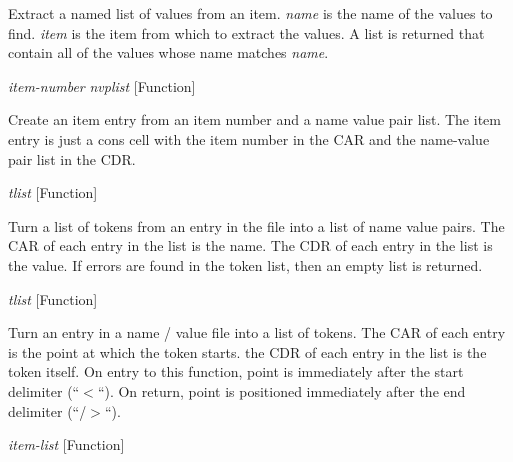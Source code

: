 \begin{doc-string}
Extract a named list of values from an item.  \emph{name} is the name of the values to
find.  \emph{item} is the item from which to extract the values.  A list is returned that contain
all of the values whose name matches \emph{name}.
\end{doc-string}

\vspace{1em}
\noindent
{}
\usebox{\funcname}\emph{item-number} \emph{nvplist}
 \hfill [Function]

\begin{doc-string}
Create an item entry from an item number and a name value pair list.
The item entry is just a cons cell with the item number in the CAR and the
name-value pair list in the CDR.
\end{doc-string}

\vspace{1em}
\noindent
{}
\usebox{\funcname}\emph{tlist}
 \hfill [Function]

\begin{doc-string}
Turn a list of tokens from an entry in the file into a list of name value pairs.  The
CAR of each entry in the list is the name.  The CDR of each entry in the list is the value.  If
errors are found in the token list, then an empty list is returned.
\end{doc-string}

\vspace{1em}
\noindent
{}
\usebox{\funcname}\emph{tlist}
 \hfill [Function]

\begin{doc-string}
Turn an entry in a name / value file into a list of tokens.  The CAR of each entry is the point
at which the token starts.  the CDR of each entry in the list is the token itself.  On entry
to this function, point is immediately after the start delimiter (``$<$``).  On return, point
is positioned immediately after the end delimiter (``/$>$``).
\end{doc-string}

\vspace{1em}
\noindent
{}
\usebox{\funcname}\emph{item-list}
 \hfill [Function]

